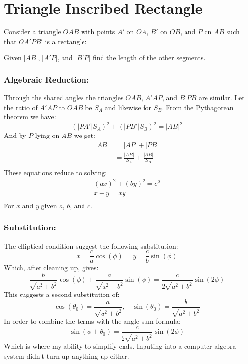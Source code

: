 
\section{Triangle Inscribed Rectangle}
Consider a triangle $OAB$ with points $A'$ on $OA$, $B'$ on $OB$, and $P$ on $AB$ such that $OA'PB'$ is a rectangle:
\begin{center}
\end{center}
Given $|AB|$, $|A'P|$, and $|B'P|$ find the length of the other segments.

\subsubsection{Algebraic Reduction:}
Through the shared angles the triangles $OAB$, $A'AP$, and $B'PB$ are similar.
Let the ratio of $A'AP$ to $OAB$ be $S_A$ and likewise for $S_B$.
From the Pythagorean theorem we have:
\[ (|PA'|S_A)^2+(|PB'|S_B)^2=|AB|^2\]
And by $P$ lying on $AB$ we get:
\[\begin{aligned}
	|AB| &= |AP|+|PB|\\
	&=\frac{|AB|}{S_A}+\frac{|AB|}{S_B}\\
\end{aligned}\]
These equations reduce to solving:
\[\begin{matrix}
	(ax)^2+(by)^2=c^2\\
	x+y=xy\\
\end{matrix}\]
For $x$ and $y$ given $a$, $b$, and $c$.

\subsubsection{Substitution:}
The elliptical condition suggest the following substitution:
\[x = \frac{c}{a}\cos(\phi),\quad y = \frac{c}{b}\sin(\phi)\]
Which, 
after cleaning up,
gives:
\[\frac{b}{\sqrt{a^2+b^2}}\cos(\phi)+\frac{a}{\sqrt{a^2+b^2}}\sin(\phi)=\frac{c}{2\sqrt{a^2+b^2}}\sin(2\phi)\]
This suggests a second substitution of:
\[\cos(\theta_0) = \frac{a}{\sqrt{a^2+b^2}},\quad \sin(\theta_0) = \frac{b}{\sqrt{a^2+b^2}}\]
In order to combine the terms with the angle sum formula:
\[\sin(\phi+\theta_0) = \frac{c}{2\sqrt{a^2+b^2}}\sin(2\phi)\]
Which is where my ability to simplify ends.
Inputing into a computer algebra system didn't turn up anything up either.

